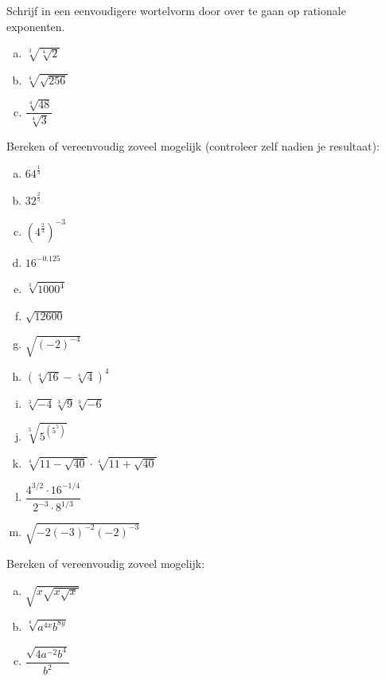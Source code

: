 \documentclass[12pt,twoside]{article}
\begin{document}
\begin{oefening}
Schrijf in een eenvoudigere wortelvorm door over te gaan op rationale exponenten.
\begin{multicols}{2}
\begin{enumerate}[(a)]
  \itemsep1em
  \item $\sqrt[3]{\sqrt[4]{2}}$
  \item $\sqrt[4]{\sqrt{256}}$
  \item $\dfrac{\sqrt[4]{48}}{\sqrt[4]{3}}$
\end{enumerate}
\end{multicols}
\end{oefening}

\begin{oefening}
Bereken of vereenvoudig zoveel mogelijk (controleer zelf nadien je resultaat):
\begin{multicols}{3}
\begin{enumerate}[(a)]
  \itemsep1em
  \item $64^{\frac{1}{3}}$
  \item $32^{\frac{2}{5}}$
  \item $\left(4^{\frac{2}{3}}\right)^{-3}$
  \item $16^{-0.125}$
  \item $\sqrt[3]{1000^4}$
  \item $\sqrt{12600}$
  \item $\sqrt{\left(-2\right)^{-4}}$
  \item $\left(\sqrt[4]{16}-\sqrt[4]{4}\right)^4$
  \item $\sqrt[3]{-4}\sqrt[3]{9}\sqrt[3]{-6}$
  \item $\sqrt[5]{5^{(5^5)}}$
  \item $\sqrt[4]{11-\sqrt{40}}\cdot\sqrt[4]{11+\sqrt{40}}$
  \item $\dfrac{4^{3/2}\cdot 16^{-1/4}}{2^{-3}\cdot 8^{1/3}}$
  \item $\sqrt{-2(-3)^{-2}(-2)^{-3}}$
\end{enumerate}
\end{multicols}
\end{oefening}

\begin{oefening}
Bereken of vereenvoudig zoveel mogelijk:
\begin{multicols}{3}
\begin{enumerate}[(a)]
  \item $\sqrt{x\sqrt{x\sqrt{x}}}$
  \item $\sqrt[4]{a^{4x}b^{8y}}$
  \item $\dfrac{\sqrt{4a^{-2}b^4}}{b^2}$
\end{enumerate}
\end{multicols}
\end{oefening}
\end{document}
